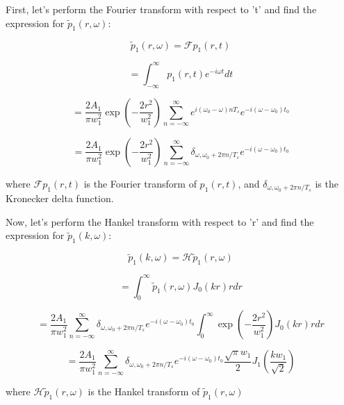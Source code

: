 \documentclass{resume} %
\begin{document}
 
First, let's perform the Fourier transform with respect to 't' and find the expression for $\tilde{p}_1(r, \omega)$:

$$\tilde{p}_1(r, \omega) = \mathcal{F} {p_1(r, t)}$$

$$= \int_{-\infty}^{\infty} p_1(r, t) e^{-i \omega t} dt$$

$$ = \frac{2 A_1}{\pi w_1^2} \exp \left(-\frac{2 r^2}{w_1^2}\right) \sum_{n=-\infty}^{\infty} e^{i(\omega_0 - \omega) n T_s} e^{-i (\omega - \omega_0) t_0}$$

$$= \frac{2 A_1}{\pi w_1^2} \exp \left(-\frac{2 r^2}{w_1^2}\right) \sum_{n=-\infty}^{\infty} \delta_{\omega, \omega_0 + 2\pi n/T_s} e^{-i (\omega - \omega_0) t_0}$$

where $\mathcal{F} {p_1(r, t)}$ is the Fourier transform of $p_1(r, t)$, and $\delta_{\omega, \omega_0 + 2\pi n/T_s}$ is the Kronecker delta function.

Now, let's perform the Hankel transform with respect to 'r' and find the expression for $\tilde{p}_1(k, \omega)$:

$$\tilde{p}_1(k, \omega) = \mathcal{H} {\tilde{p}_1(r, \omega)}$$

$$ = \int_0^{\infty} \tilde{p}_1(r, \omega) J_0(kr) r dr$$

$$ = \frac{2 A_1}{\pi w_1^2} \sum_{n=-\infty}^{\infty} \delta_{\omega, \omega_0 + 2\pi n/T_s} e^{-i (\omega - \omega_0) t_0} \int_0^{\infty} \exp \left(-\frac{2 r^2}{w_1^2}\right) J_0(kr) r dr$$

$$ = \frac{2 A_1}{\pi w_1^2} \sum_{n=-\infty}^{\infty} \delta_{\omega, \omega_0 + 2\pi n/T_s} e^{-i (\omega - \omega_0) t_0} \frac{\sqrt{\pi} w_1}{2} J_1\left(\frac{kw_1}{\sqrt{2}}\right)$$

where $\mathcal{H} {\tilde{p}_1(r, \omega)}$ is the Hankel transform of $\tilde{p}_1(r, \omega)$
\end{document}
